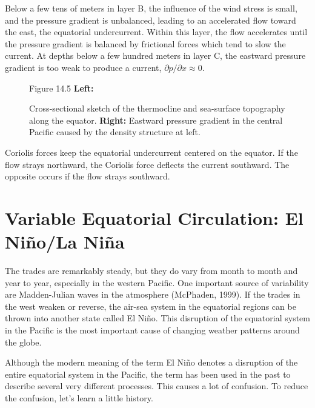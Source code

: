 Below a few tens of meters in layer B, the influence of the wind stress is
small, and the pressure gradient is unbalanced, leading to an accelerated flow
toward the east, the equatorial undercurrent. Within this layer, the flow
accelerates until the pressure gradient is balanced by frictional forces which
tend to slow the current. At depths below a few hundred meters in layer C, the
eastward pressure gradient is too weak to produce a current, $\partial p / \partial x \approx 0$.

\begin{figure}[t!]
\footnotesize
Figure 14.5 \textbf{Left:} \rule{0pt}{3ex}Cross-sectional sketch
of the thermocline and sea-surface topography along the equator.
\textbf{Right:} Eastward pressure gradient in the central Pacific caused by the density
structure at left.
\label{fig:equatorsketch}
\vspace{-4ex}
\end{figure}

Coriolis forces keep the equatorial undercurrent centered on the equator. If
the flow strays northward, the Coriolis force deflects the current southward.
The opposite occurs if the flow strays southward.

\section[El Ni\~{n}o]{Variable Equatorial Circulation: El Ni\~{n}o/La
Ni\~{n}a} The trades are remarkably steady, but they do vary from month to month and year to year, especially in the western Pacific. One important source of variability are Madden-Julian waves in the atmosphere (McPhaden, 1999). If the trades in the west weaken or reverse, the air-sea system in the equatorial regions can be thrown into another state called El Ni\~{n}o. This disruption of the equatorial system in the Pacific is the most important cause of changing weather patterns around the globe.

Although the modern meaning of the term El Ni\~{n}o denotes a disruption of the
entire equatorial system in the Pacific, the term has been used in the past to
describe several very different processes. This causes a lot of confusion. To
reduce the confusion, let's learn a little history.

